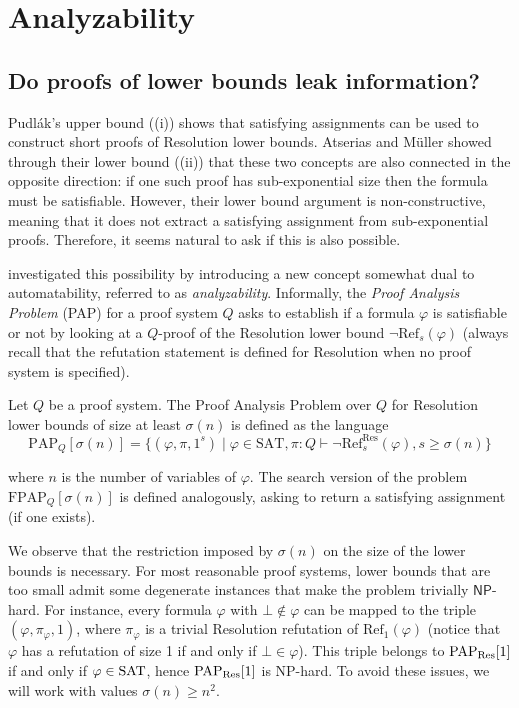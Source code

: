 \chapter{Analyzability} \label{chap:analyzability}

\section{Do proofs of lower bounds leak information?}

Pudlák's upper bound ((i)) shows that satisfying assignments can be used to construct short proofs of Resolution lower bounds. Atserias and Müller showed through their lower bound ((ii)) that these two concepts are also connected in the opposite direction: if one such proof has sub-exponential size then the formula must be satisfiable. However, their lower bound argument is non-constructive, meaning that it does not extract a satisfying assignment from sub-exponential proofs. Therefore, it seems natural to ask if this is also possible.

\textcite{pap} investigated this possibility by introducing a new concept somewhat dual to automatability, referred to as \textit{analyzability}. Informally, the \textit{Proof Analysis Problem} (PAP) for a proof system $Q$ asks to establish if a formula $\varphi$ is satisfiable or not by looking at a $Q$-proof of the Resolution lower bound $\lnot \mathrm{Ref}_s(\varphi)$ (always recall that the refutation statement is defined for Resolution when no proof system is specified).

\begin{definition}
    Let $Q$ be a proof system. The Proof Analysis Problem over $Q$ for Resolution lower bounds of size at least $\sigma(n)$ is defined as the language
    \[\mathrm{PAP}_Q[\sigma(n)] = \{(\varphi, \pi, 1^s) \mid \varphi \in \mathrm{SAT}, \pi : Q \vdash \lnot \mathrm{Ref}^{\mathrm{Res}}_s(\varphi), s \geq \sigma(n)\}\]

    \noindent
    where $n$ is the number of variables of $\varphi$. The search version of the problem $\mathrm{FPAP}_Q[\sigma(n)]$ is defined analogously, asking to return a satisfying assignment (if one exists).
\end{definition}

We observe that the restriction imposed by $\sigma(n)$ on the size of the lower bounds is necessary. For most reasonable proof systems, lower bounds that are too small admit some degenerate instances that make the problem trivially $\mathsf{NP}$-hard. For instance, every formula $\varphi$ with $\bot \notin \varphi$ can be mapped to the triple $(\varphi, \pi_\varphi, 1)$, where $\pi_\varphi$ is a trivial Resolution refutation of $\mathrm{Ref}_1(\varphi)$ (notice that $\varphi$ has a refutation of size 1 if and only if $\bot \in \varphi$). This triple belongs to $\mathrm{PAP}_{\mathrm{Res}}[1]$ if and only if $\varphi \in \mathrm{SAT}$, hence $\mathrm{PAP}_{\mathrm{Res}}[1]$ is NP-hard. To avoid these issues, we will work with values $\sigma(n) \geq n^2$.

